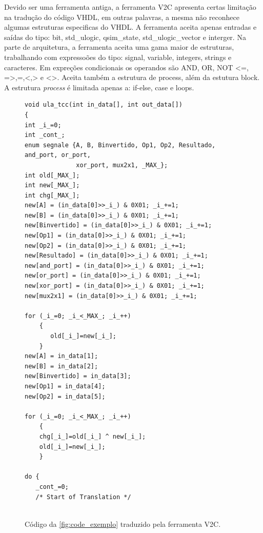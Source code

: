 \par
Devido ser uma ferramenta antiga, a ferramenta V2C apresenta certas limitação na tradução do código VHDL, em outras palavras, a mesma não reconhece algumas estruturas especificas do VHDL. A ferramenta aceita apenas entradas e saídas do tipo: bit, std\_ulogic, qsim\_state, std\_ulogic\_vector e interger. Na parte de arquitetura, a ferramenta aceita uma gama maior de estruturas, trabalhando com expressoões do tipo: signal, variable, integers, strings e caracteres. Em expreções condicionais os operandos são AND, OR, NOT <=, =>,=,<,> e <>. Aceita também a estrutura de process, além da estutura block. A estrutura \textit{process} é limitada apenas a: if-else, case e  loops.
\begin{figure}[h]
\caption{\label{fig:code_traduzido} Código da \autoref{fig:code_exemplo} traduzido pela ferramenta V2C.}
	\begin{center}
    \begin{minipage}{0.99\textwidth}
    \begin{lstlisting}       
void ula_tcc(int in_data[], int out_data[])
{
int _i_=0;
int _cont_;
enum segnale {A, B, Binvertido, Op1, Op2, Resultado, and_port, or_port, 
              xor_port, mux2x1, _MAX_};
int old[_MAX_];
int new[_MAX_];
int chg[_MAX_];
new[A] = (in_data[0]>>_i_) & 0X01; _i_+=1;
new[B] = (in_data[0]>>_i_) & 0X01; _i_+=1;
new[Binvertido] = (in_data[0]>>_i_) & 0X01; _i_+=1;
new[Op1] = (in_data[0]>>_i_) & 0X01; _i_+=1;
new[Op2] = (in_data[0]>>_i_) & 0X01; _i_+=1;
new[Resultado] = (in_data[0]>>_i_) & 0X01; _i_+=1;
new[and_port] = (in_data[0]>>_i_) & 0X01; _i_+=1;
new[or_port] = (in_data[0]>>_i_) & 0X01; _i_+=1;
new[xor_port] = (in_data[0]>>_i_) & 0X01; _i_+=1;
new[mux2x1] = (in_data[0]>>_i_) & 0X01; _i_+=1;

for (_i_=0; _i_<_MAX_; _i_++)
    {
       old[_i_]=new[_i_];
    }
new[A] = in_data[1];
new[B] = in_data[2];
new[Binvertido] = in_data[3];
new[Op1] = in_data[4];
new[Op2] = in_data[5];

for (_i_=0; _i_<_MAX_; _i_++)
    {
    chg[_i_]=old[_i_] ^ new[_i_];
    old[_i_]=new[_i_];
    }

do {
   _cont_=0;
   /* Start of Translation */


\end{lstlisting}
\end{minipage}
\end{center}
\end{figure}
